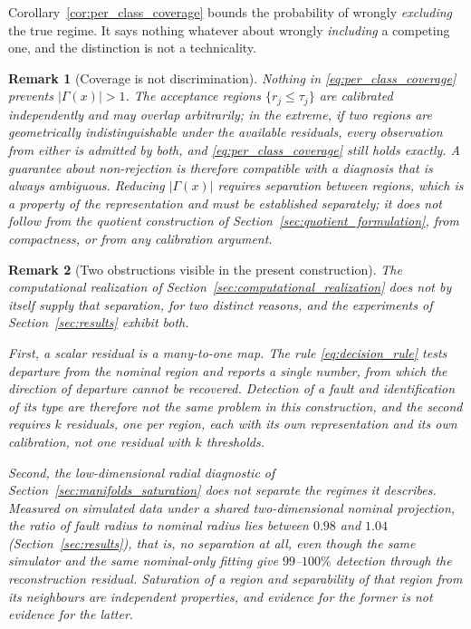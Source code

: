 \documentclass[a4paper]{cas-sc}
\newtheorem{remark}{Remark}
\newcommand{\residual}{\ensuremath{r}}
\begin{document}
Corollary~\ref{cor:per_class_coverage} bounds the probability of wrongly
\emph{excluding} the true regime. It says nothing whatever about wrongly
\emph{including} a competing one, and the distinction is not a technicality.

\begin{remark}[Coverage is not discrimination]
\label{rem:coverage_not_discrimination}
Nothing in \eqref{eq:per_class_coverage} prevents
\(|\Gamma(x)|>1\). The acceptance regions \(\{\residual_j\le\tau_j\}\) are
calibrated independently and may overlap arbitrarily; in the extreme, if two
regions are geometrically indistinguishable under the available residuals,
every observation from either is admitted by both, and
\eqref{eq:per_class_coverage} still holds exactly. A guarantee about
non-rejection is therefore compatible with a diagnosis that is always
ambiguous. Reducing \(|\Gamma(x)|\) requires \emph{separation} between
regions, which is a property of the representation and must be established
separately; it does not follow from the quotient construction of
Section~\ref{sec:quotient_formulation}, from compactness, or from any
calibration argument.
\end{remark}

\begin{remark}[Two obstructions visible in the present construction]
\label{rem:classification_obstructions}
The computational realization of
Section~\ref{sec:computational_realization} does not by itself supply that
separation, for two distinct reasons, and the experiments of
Section~\ref{sec:results} exhibit both.

First, a scalar residual is a many-to-one map. The rule
\eqref{eq:decision_rule} tests departure from the nominal region and reports a
single number, from which the \emph{direction} of departure cannot be
recovered. Detection of a fault and identification of its type are therefore
not the same problem in this construction, and the second requires \(k\)
residuals, one per region, each with its own representation and its own
calibration, not one residual with \(k\) thresholds.

Second, the low-dimensional radial diagnostic of
Section~\ref{sec:manifolds_saturation} does not separate the regimes it
describes. Measured on simulated data under a shared two-dimensional nominal
projection, the ratio of fault radius to nominal radius lies between \(0.98\)
and \(1.04\) (Section~\ref{sec:results}), that is, no separation at all, even
though the same simulator and the same nominal-only fitting give
\(99\)--\(100\%\) detection through the reconstruction residual. Saturation of
a region and separability of that region from its neighbours are independent
properties, and evidence for the former is not evidence for the latter.
\end{remark}
\end{document}

